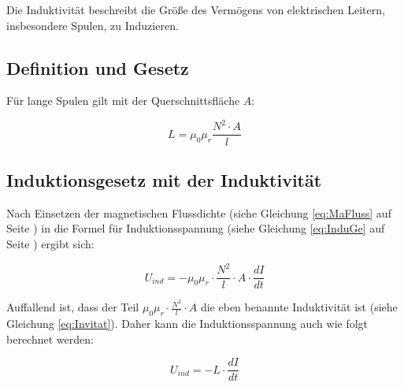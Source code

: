 Die Induktivität beschreibt die Größe des Vermögens von elektrischen Leitern, insbesondere Spulen, zu Induzieren.

\subsection{Definition und Gesetz}

Für lange Spulen gilt mit der Querschnittsfläche $A$:

\begin{equation} \label{eq:Invitat}
	L = \mu_0 \mu_r \frac{N^2 \cdot A}{l}
\end{equation} 


\subsection{Induktionsgesetz mit der Induktivität}

Nach Einsetzen der magnetischen Flussdichte (siehe Gleichung \ref{eq:MaFluss} auf Seite \pageref{eq:MaFluss}) in die Formel für Induktionsspannung (siehe Gleichung \ref{eq:InduGe} auf Seite \pageref{eq:InduGe}) ergibt sich:

\begin{equation}
	U_{ind} = - \mu_0 \mu_r \cdot \frac{N^2}{l}
				\cdot A \cdot \frac{dI}{dt}
\end{equation}

Auffallend ist, dass der Teil $\mu_0 \mu_r \cdot \frac{N^2}{l} \cdot A$ die eben benannte Induktivität ist (siehe Gleichung \ref{eq:Invitat}). Daher kann die Induktionsspannung auch wie folgt berechnet werden:

\begin{equation}
	U_{ind} = - L \cdot \frac{dI}{dt}
\end{equation}